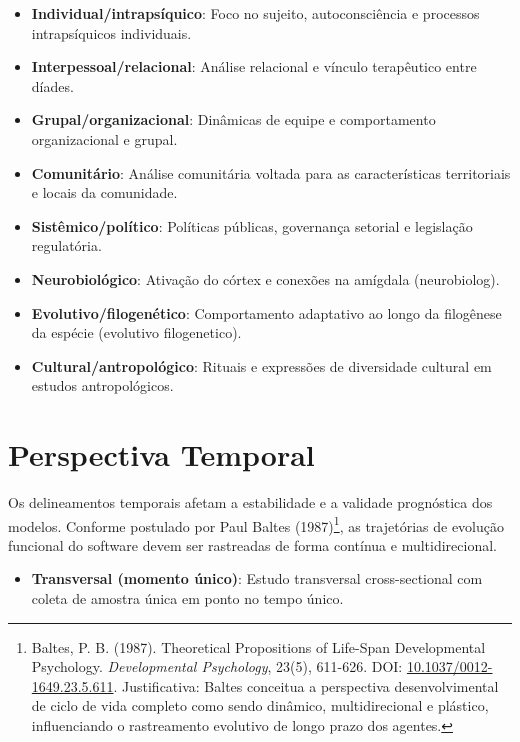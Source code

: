 \documentclass[12pt,a4paper,oneside]{abntex2}
\begin{document}
\begin{apendicesenv}
\begin{itemize}
    \item \textbf{Individual/intrapsíquico}: Foco no sujeito, autoconsciência e processos intrapsíquicos individuais.

    \item \textbf{Interpessoal/relacional}: Análise relacional e vínculo terapêutico entre díades.

    \item \textbf{Grupal/organizacional}: Dinâmicas de equipe e comportamento organizacional e grupal.

    \item \textbf{Comunitário}: Análise comunitária voltada para as características territoriais e locais da comunidade.

    \item \textbf{Sistêmico/político}: Políticas públicas, governança setorial e legislação regulatória.

    \item \textbf{Neurobiológico}: Ativação do córtex e conexões na amígdala (neurobiolog).

    \item \textbf{Evolutivo/filogenético}: Comportamento adaptativo ao longo da filogênese da espécie (evolutivo filogenetico).

    \item \textbf{Cultural/antropológico}: Rituais e expressões de diversidade cultural em estudos antropológicos.
\end{itemize}

\section{Perspectiva Temporal}

Os delineamentos temporais afetam a estabilidade e a validade prognóstica dos modelos. Conforme postulado por Paul Baltes (1987)\footnote{Baltes, P. B. (1987). Theoretical Propositions of Life-Span Developmental Psychology. \textit{Developmental Psychology}, 23(5), 611-626. DOI: \href{https://doi.org/10.1037/0012-1649.23.5.611}{10.1037/0012-1649.23.5.611}. Justificativa: Baltes conceitua a perspectiva desenvolvimental de ciclo de vida completo como sendo dinâmico, multidirecional e plástico, influenciando o rastreamento evolutivo de longo prazo dos agentes.}, as trajetórias de evolução funcional do software devem ser rastreadas de forma contínua e multidirecional.

\begin{itemize}
    \item \textbf{Transversal (momento único)}: Estudo transversal cross-sectional com coleta de amostra única em ponto no tempo único.


\end{itemize}
\end{apendicesenv}
\end{document}
